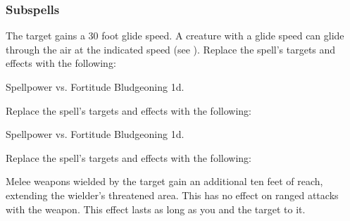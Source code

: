 \subsubsection{Subspells}
The target gains a 30 foot glide speed.
A creature with a glide speed can glide through the air at the indicated speed (see ).
Replace the spell's targets and effects with the following:
\begin{spellcontent}
\begin{augmenttargetinginfo}
\end{augmenttargetinginfo}
\begin{augmenteffects}
\begin{spellattack}{Spellpower vs. Fortitude}
\spellsuccess Bludgeoning  \plus1d.
\end{spellattack}
\end{augmenteffects}
\end{spellcontent}
Replace the spell's targets and effects with the following:
\begin{spellcontent}
\begin{augmenttargetinginfo}
\end{augmenttargetinginfo}
\begin{augmenteffects}
\begin{spellattack}{Spellpower vs. Fortitude}
\spellsuccess Bludgeoning  \minus1d.
\end{spellattack}
\end{augmenteffects}
\end{spellcontent}
Replace the spell's targets and effects with the following:
\begin{spellcontent}
\begin{augmenttargetinginfo}
\end{augmenttargetinginfo}
\begin{augmenteffects}
\spelleffect
Melee weapons wielded by the target gain an additional ten feet of reach, extending the wielder's threatened area.
This has no effect on ranged attacks with the weapon.
This effect lasts as long as you and the target  to it.
\end{augmenteffects}
\end{spellcontent}
